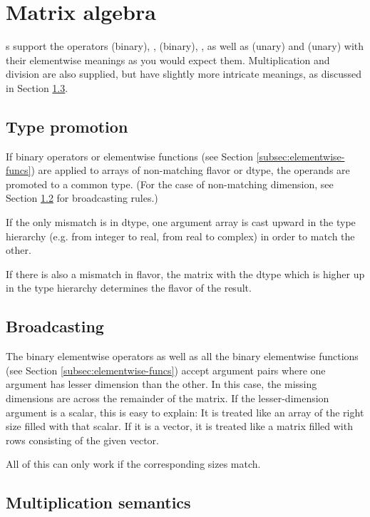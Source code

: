 \section{Matrix algebra}
s support the operators \code{+} (binary), \code{+=},
\code{-} (binary), \code{-=}, as well as \code{+} (unary) and \code{-}
(unary) with their elementwise meanings as you would expect them.
Multiplication and division are also supplied, but have slightly more
intricate meanings, as discussed in Section
\ref{subsec:arraymultiplication}.

\subsection{Type promotion}
\label{subsec:arraypromotion}

If binary operators or elementwise functions (see Section
\ref{subsec:elementwise-funcs}) are applied to arrays of non-matching flavor or
dtype, the operands are promoted to a common type. (For the case of
non-matching dimension, see Section \ref{subsec:arraybroadcast} for
broadcasting rules.)

If the only mismatch is in dtype, one argument array
is cast upward in the type hierarchy (e.g. from integer to real,
from real to complex) in order to match the other.

If there is also a mismatch in flavor, the matrix with the dtype
which is higher up in the type hierarchy determines the flavor of the
result.

\subsection{Broadcasting}
\label{subsec:arraybroadcast}

The binary elementwise operators as well as all the binary elementwise
functions (see Section \ref{subsec:elementwise-funcs}) accept argument pairs
where one argument has lesser dimension than the other. In this case, the
missing dimensions are  across the remainder
of the matrix. If the lesser-dimension argument is a scalar, this is easy to
explain: It is treated like an array of the right size filled with that scalar.
If it is a vector, it is treated like a matrix filled with rows consisting of
the given vector.

All of this can only work if the corresponding  sizes 
match.


\subsection{Multiplication semantics}
\label{subsec:arraymultiplication}

